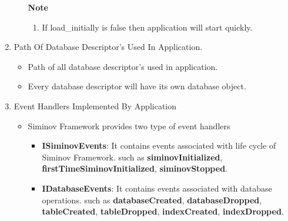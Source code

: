 \begin{enumerate}
\begin{enumerate}
\begin{center}
{{						\hfill \textbf{Note} \\

						\hfill 	
						\begin{enumerate}
			
							\item \small If load\_initially is false then application will start quickly.

						\end{enumerate}

						\vspace*{0.0cm} %
				}
			}

		\end{center}

		
		\end{enumerate}

	\item \small Path Of Database Descriptor's Used In Application.

		\begin{itemize}

			\item \small Path of all database descriptor's used in application.
			\item \small Every database descriptor will have its own database object.
		
		\end{itemize}

	\item \small Event Handlers Implemented By Application 

		\begin{itemize}

			\item \small Siminov Framework provides two type of event handlers
			
				\begin{itemize}
					\item \small \textbf{ISiminovEvents}: It contains events associated with life cycle of Siminov Framework. such as \textbf{siminovInitialized}, \textbf{firstTimeSiminovInitialized}, \textbf{siminovStopped}.
					\item \small \textbf{IDatabaseEvents}: It contains events associated with database operations. such as \textbf{databaseCreated}, \textbf{databaseDropped}, \textbf{tableCreated}, \textbf{tableDropped}, \textbf{indexCreated}, 													\textbf{indexDropped}.
		
				\end{itemize}


\end{itemize}
\end{enumerate}
